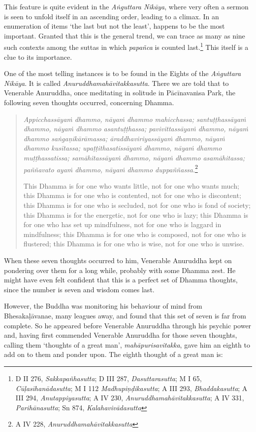 This feature is quite evident in the \emph{Aṅguttara Nikāya}, where very often a sermon is seen to unfold itself in an ascending order, leading to a climax. In an enumeration of items `the last but not the least', happens to be the most important. Granted that this is the general trend, we can trace as many as nine such contexts among the suttas in which \emph{papañca} is counted last.\footnote{D II 276, \emph{Sakkapañhasutta}; D III 287, \emph{Dasuttarasutta}; M I 65, \emph{Cūḷasīhanādasutta}; M I 112 \emph{Madhupiṇḍikasutta}; A III 293, \emph{Bhaddakasutta}; A III 294, \emph{Anutappiyasutta}; A IV 230, \emph{Anuruddhamahāvitakkasutta}; A IV 331, \emph{Parihānasutta}; Sn 874, \emph{Kalahavivādasutta}} This itself is a clue to its importance.

One of the most telling instances is to be found in the Eights of the \emph{Aṅguttara Nikāya}. It is called \emph{Anuruddhamahāvitakkasutta}. There we are told that to Venerable Anuruddha, once meditating in solitude in Pācīnavaṁsa Park, the following seven thoughts occurred, concerning Dhamma.

\begin{quote}
\emph{Appicchassāyaṁ dhammo, nāyaṁ dhammo mahicchassa; santuṭṭhassāyaṁ dhammo, nāyaṁ dhammo asantuṭṭhassa; pavivittassāyaṁ dhammo, nāyaṁ dhammo saṅgaṇikārāmassa; āraddhaviriyassāyaṁ dhammo, nāyaṁ dhammo kusītassa; upaṭṭithasatissāyaṁ dhammo, nāyaṁ dhammo muṭṭhassatissa; samāhitassāyaṁ dhammo, nāyaṁ dhammo asamāhitassa; paññavato ayaṁ dhammo, nāyaṁ dhammo duppaññassa}.\footnote{A IV 228, \emph{Anuruddhamahāvitakkasutta}}

This Dhamma is for one who wants little, not for one who wants much; this Dhamma is for one who is contented, not for one who is discontent; this Dhamma is for one who is secluded, not for one who is fond of society; this Dhamma is for the energetic, not for one who is lazy; this Dhamma is for one who has set up mindfulness, not for one who is laggard in mindfulness; this Dhamma is for one who is composed, not for one who is flustered; this Dhamma is for one who is wise, not for one who is unwise.
\end{quote}

When these seven thoughts occurred to him, Venerable Anuruddha kept on pondering over them for a long while, probably with some Dhamma zest. He might have even felt confident that this is a perfect set of Dhamma thoughts, since the number is seven and wisdom comes last.

However, the Buddha was monitoring his behaviour of mind from Bhesakaḷāvanae, many leagues away, and found that this set of seven is far from complete. So he appeared before Venerable Anuruddha through his psychic power and, having first commended Venerable Anuruddha for those seven thoughts, calling them `thoughts of a great man', \emph{mahāpurisavitakka}, gave him an eighth to add on to them and ponder upon. The eighth thought of a great man is:

